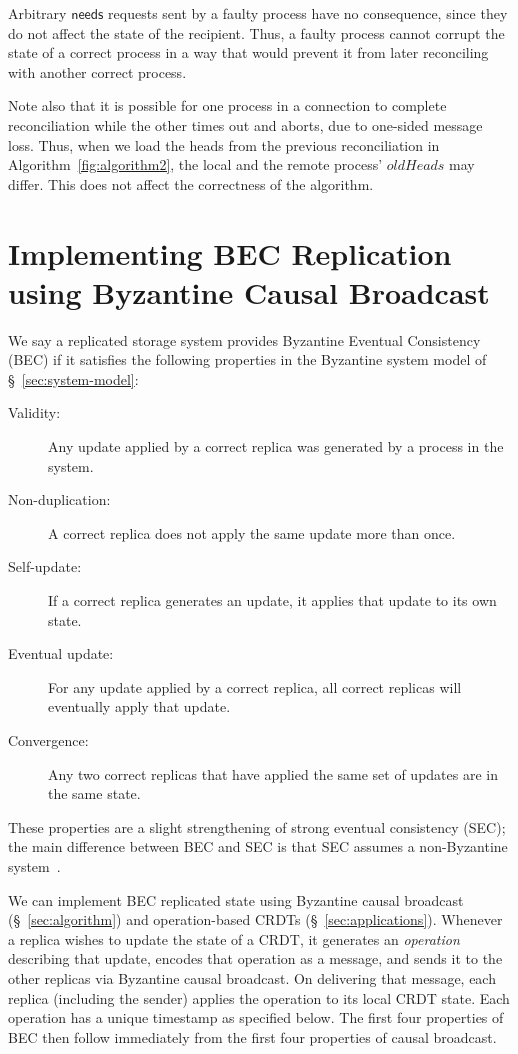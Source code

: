 \documentclass[a4paper,anonymous,USenglish]{lipics-v2019}
\begin{document}
Arbitrary $\mathsf{needs}$ requests sent by a faulty process have no consequence, since they do not affect the state of the recipient.
Thus, a faulty process cannot corrupt the state of a correct process in a way that would prevent it from later reconciling with another correct process.

Note also that it is possible for one process in a connection to complete reconciliation while the other times out and aborts, due to one-sided message loss.
Thus, when we load the heads from the previous reconciliation in Algorithm~\ref{fig:algorithm2}, the local and the remote process' $\mathit{oldHeads}$ may differ.
This does not affect the correctness of the algorithm.

\section{Implementing BEC Replication using Byzantine Causal Broadcast}\label{sec:byzantine-crdts}

We say a replicated storage system provides Byzantine Eventual Consistency (BEC) if it satisfies the following properties in the Byzantine system model of \S~\ref{sec:system-model}:

\begin{description}
\item[Validity:] Any update applied by a correct replica was generated by a process in the system.
\item[Non-duplication:] A correct replica does not apply the same update more than once.
\item[Self-update:] If a correct replica generates an update, it applies that update to its own state.
\item[Eventual update:] For any update applied by a correct replica, all correct replicas will eventually apply that update.
\item[Convergence:] Any two correct replicas that have applied the same set of updates are in the same state.
\end{description}

These properties are a slight strengthening of strong eventual consistency (SEC); the main difference between BEC and SEC is that SEC assumes a non-Byzantine system~\cite{Shapiro:2011}.

We can implement BEC replicated state using Byzantine causal broadcast (\S~\ref{sec:algorithm}) and operation-based CRDTs (\S~\ref{sec:applications}).
Whenever a replica wishes to update the state of a CRDT, it generates an \emph{operation} describing that update, encodes that operation as a message, and sends it to the other replicas via Byzantine causal broadcast.
On delivering that message, each replica (including the sender) applies the operation to its local CRDT state.
Each operation has a unique timestamp as specified below.
The first four properties of BEC then follow immediately from the first four properties of causal broadcast.
\end{document}
